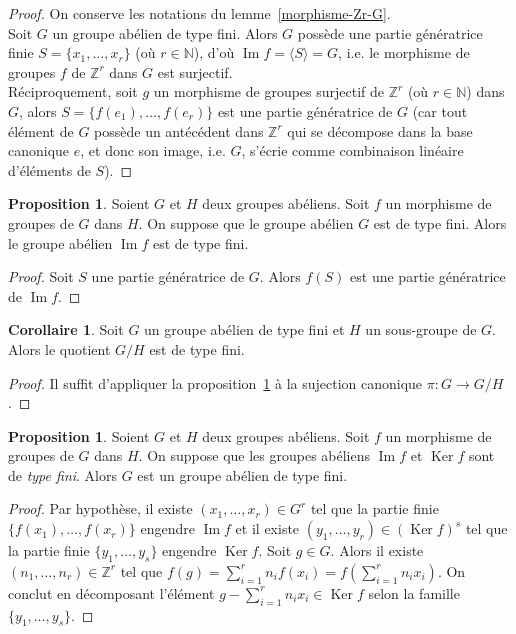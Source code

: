 \documentclass{report}
\newcommand{\Z}{\mathbb{Z}}
\newcommand{\N}{\mathbb{N}}
\newcommand{\im}{\mathop{\mathrm{Im}}\nolimits}
\renewcommand{\ker}{\mathop{\mathrm{Ker}}\nolimits}
\newcommand{\dis}{\displaystyle}
\theoremstyle{definition}
\newtheorem{prop}[defi]{Proposition}
\newtheorem{coro}[defi]{Corollaire}
\begin{document}
\begin{proof}
On conserve les notations du lemme~\ref{morphisme-Zr-G}. \\
Soit $G$ un groupe abélien de type fini. Alors $G$ possède une partie génératrice finie $S=\{x_1, \ldots, x_r \}$ (où $r \in \N$), d'où $\im f=\langle S\rangle=G$,
i.e. le morphisme de groupes $f$ de $\Z^r$ dans $G$ est surjectif. \\
Réciproquement, soit $g$ un morphisme de groupes surjectif de $\Z^r$ (où $r \in \N$) dans $G$, alors $S=\{f(e_1), \ldots, f(e_r) \}$ est une partie génératrice de $G$ (car tout élément de $G$ possède un antécédent dans $\Z^r$ qui se décompose dans la base canonique $e$, et donc son image, i.e. $G$, s'écrie comme combinaison linéaire d'éléments de $S$). 
\end{proof}

\begin{prop}\label{image-type-fini}
Soient $G$ et $H$ deux groupes abéliens. Soit $f$ un morphisme de groupes de $G$ dans $H$. On suppose que le groupe abélien $G$ est de type fini. Alors le groupe abélien $\im f$ est de type fini.
\end{prop}

\begin{proof}
Soit $S$ une partie génératrice de $G$. Alors $f(S)$ est une partie génératrice de $\im f$.
\end{proof}

\begin{coro}
Soit $G$ un groupe ab\'elien de type fini et $H$ un sous-groupe de $G$. Alors le quotient $G/H$ est de type fini.
\end{coro}

\begin{proof}
Il suffit d'appliquer la proposition~\ref{image-type-fini} \`a la sujection canonique $\pi:G\to G/H$.
\end{proof}

\begin{prop}\label{g-type-fini-par-morphisme}
Soient $G$ et $H$ deux groupes abéliens. Soit $f$ un morphisme de groupes de $G$ dans $H$. On suppose que les groupes abéliens $\im f$ et $\ker f$ sont de \textit{type fini}. Alors $G$ est un groupe abélien de type fini.
\end{prop}

\begin{proof}
Par hypothèse, il existe $(x_1, \ldots, x_r) \in G^r$ tel que la partie finie $\{f(x_1), \ldots, f(x_r) \}$ engendre $\im f$ et il existe $(y_1, \ldots, y_r) \in (\ker f)^s$ tel que la partie finie $\{y_1, \ldots, y_s \}$ engendre $\ker f$. Soit $g \in G$. Alors il existe $(n_1, \ldots, n_r) \in \Z^r$ tel que $f(g)=\dis \sum_{i=1}^r n_if(x_i)=f\left(\sum_{i=1}^r n_ix_i\right)$. On conclut en décomposant l'élément $g-\dis \sum_{i=1}^r n_ix_i\in \ker f$ selon la famille $\{y_1, \ldots, y_s\}$.
\end{proof}
\end{document}
